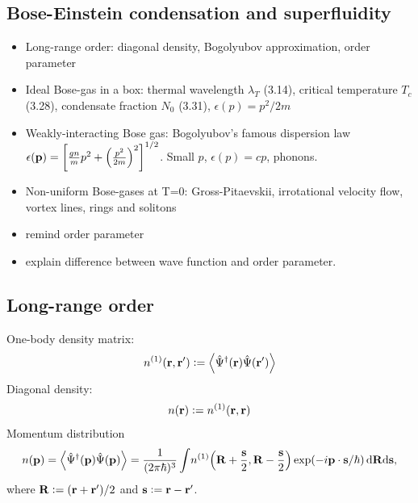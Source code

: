 \documentclass[11pt,a4paper,twoside]{article}
\renewcommand{\vec}[1]{\bm{\mathrm{#1}}}
\begin{document}
		\subsection{Bose-Einstein condensation and superfluidity}		
			\begin{itemize}
				\item Long-range order: diagonal density, Bogolyubov approximation, order parameter
				\item Ideal Bose-gas in a box: thermal wavelength $\lambda_T$ (3.14), critical temperature $T_c$ (3.28), condensate fraction $N_0$ (3.31), $\epsilon(p)=p^2/2m$
				\item Weakly-interacting Bose gas: Bogolyubov's famous dispersion law $\epsilon(\vec{p})=\qty[\frac{gn}{m}p^2+\qty(\frac{p^2}{2m})^2]^{1/2}$. Small $p$, $\epsilon(p)=cp$, phonons.
				\item Non-uniform Bose-gases at T=0: Gross-Pitaevskii, irrotational velocity flow, vortex lines, rings and solitons
				\item remind order parameter
				\item explain difference between wave function and order parameter.
			\end{itemize}

		\subsection{Long-range order}
			One-body density matrix:
			\begin{align}
				n^{(1)}(\vec{r},\vec{r}') \vcentcolon=\expval{\hat{\Psi}^\dagger(\vec{r})\hat{\Psi}(\vec{r}')}
			\end{align}
			Diagonal density:
			\begin{align}
				n(\vec{r})\vcentcolon  = n^{(1)}(\vec{r},\vec{r})
			\end{align}
			Momentum distribution
			\begin{align}
				n(\vec{p}) = \expval{\hat{\Psi}^\dagger(\vec{p})\hat{\Psi}(\vec{p})} = \frac{1}{(2\pi\hbar)^3}\int \! n^{(1)}\qty(\vec{R}+\frac{\vec{s}}{2},\vec{R}-\frac{\vec{s}}{2})\exp(-i\vec{p}\cdot\vec{s}/\hbar)\,\mathrm{d}\vec{R}\mathrm{d}\vec{s},
			\end{align}
			where $\vec{R}\vcentcolon=(\vec{r}+\vec{r}')/2$ and $\vec{s}\vcentcolon=\vec{r}-\vec{r}'$.
\end{document}
